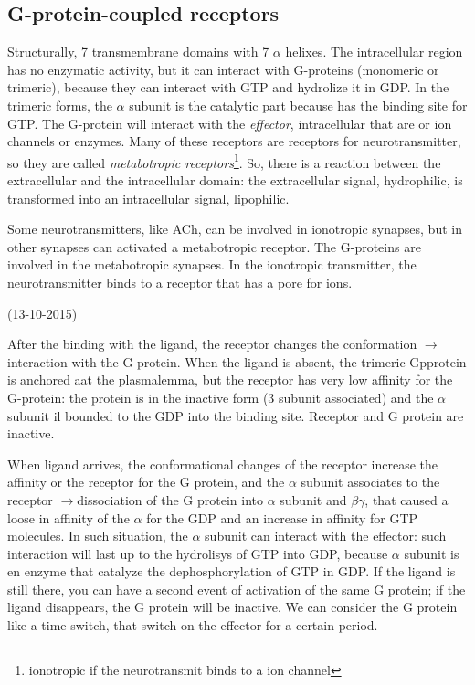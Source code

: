 \documentclass[a4paper, 12pt]{book}
\newcommand{\lfreccia}{\ensuremath{\longrightarrow}}
\begin{document}
\subsection{G-protein-coupled receptors}
Structurally,  7 transmembrane domains with 7 $\alpha$ helixes.  The intracellular region has no enzymatic activity, but it can interact with G-proteins (monomeric or trimeric), because they can interact with GTP and hydrolize it in GDP. In the trimeric forms, the $\alpha$ subunit is the catalytic part because has the binding site for GTP. The G-protein will interact with the \emph{effector}, intracellular that are or ion channels or enzymes. Many of these receptors are receptors for neurotransmitter, so they are called \emph{metabotropic receptors}\footnote{ionotropic if the neurotransmit binds to a ion channel}. So, there is a reaction between the extracellular and the intracellular domain: the extracellular signal, hydrophilic, is transformed into an intracellular signal, lipophilic.

Some neurotransmitters, like ACh, can be involved in ionotropic synapses, but in other synapses can activated a metabotropic receptor.
The G-proteins are involved in the metabotropic synapses. In the ionotropic transmitter, the neurotransmitter binds to a receptor that has a pore for ions.

(13-10-2015)

After the binding with the ligand, the receptor changes the conformation \lfreccia interaction with the G-protein. When the ligand is absent, the trimeric Gpprotein is anchored aat the plasmalemma, but the receptor has very low affinity for the G-protein: the protein is in the inactive form (3 subunit associated) and the $\alpha$ subunit il bounded to the GDP into the binding site. Receptor and G protein are inactive.

When ligand arrives, the conformational changes of the receptor increase the affinity or the receptor for the G protein, and the $\alpha$ subunit associates to the receptor \lfreccia dissociation of the G protein into $\alpha$ subunit and $\beta \gamma$, that caused a loose in affinity of the $\alpha$ for the GDP and an increase in affinity for GTP molecules. In such situation, the $\alpha$ subunit can interact with the effector: such interaction will last up to the hydrolisys of GTP into GDP, because $\alpha$ subunit is en enzyme that catalyze the dephosphorylation of GTP in GDP. If the ligand is still there, you can have a second event of activation of the same G protein; if the ligand disappears, the G protein will be inactive. We can consider the G protein like a time switch, that switch on the effector for a certain period.
\end{document}
